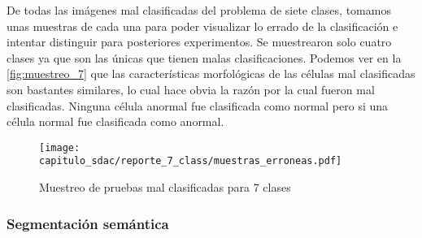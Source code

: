 \begin{table}[H]
    \centering
    \caption{Métricas de diagnóstico de 7 clases}
    \label{tabla:diag_7}
    \end{table}

De todas las imágenes mal clasificadas del problema de siete clases, tomamos
unas muestras de cada una para poder visualizar lo errado de la clasificación e
intentar distinguir para posteriores experimentos. Se muestrearon solo cuatro
clases ya que son las únicas que tienen malas clasificaciones. Podemos ver en la
\autoref{fig:muestreo_7} que las características morfológicas de las células mal
clasificadas son bastantes similares, lo cual hace obvia la razón por la cual
fueron mal clasificadas. Ninguna célula anormal fue clasificada como normal pero
si una célula normal fue clasificada como anormal.

\begin{figure}[H]
    \centering
    \texttt{[image: capitulo\_sdac/reporte\_7\_class/muestras\_erroneas.pdf]}
    \caption{Muestreo de pruebas mal clasificadas para 7 clases}\label{fig:muestreo_7}
\end{figure}

\subsubsection{Segmentación semántica}

